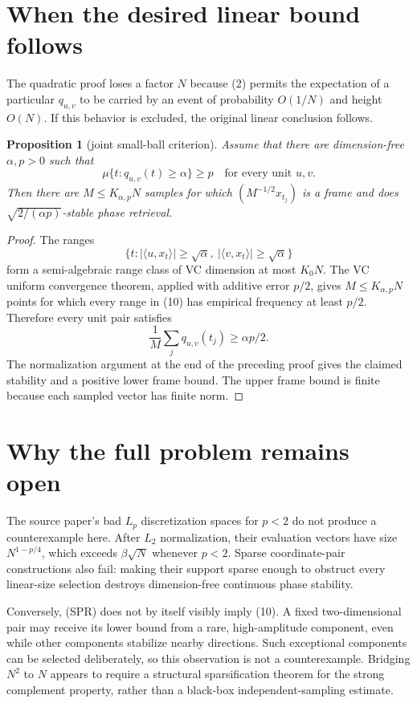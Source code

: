 \documentclass[11pt]{article}
\newtheorem{proposition}{Proposition}
\newcommand{\ip}[2]{\langle #1,#2\rangle}
\begin{document}
\section{When the desired linear bound follows}

The quadratic proof loses a factor $N$ because (2) permits the expectation
of a particular $q_{u,v}$ to be carried by an event of probability
$O(1/N)$ and height $O(N)$.  If this behavior is excluded, the original
linear conclusion follows.

\begin{proposition}[joint small-ball criterion]\label{prop:smallball}
Assume that there are dimension-free $\alpha,p>0$ such that
\[
 \mu\{t:q_{u,v}(t)\ge\alpha\}\ge p
 \quad\text{for every unit }u,v.                              \tag{10}
\]
Then there are $M\le K_{\alpha,p}N$ samples for which
$(M^{-1/2}x_{t_j})$ is a frame and does
$\sqrt{2/(\alpha p)}$-stable phase retrieval.
\end{proposition}

\begin{proof}
The ranges
\[
 \{t:|\ip{u}{x_t}|\ge\sqrt\alpha,\
       |\ip{v}{x_t}|\ge\sqrt\alpha\}
\]
form a semi-algebraic range class of VC dimension at most $K_0N$.
The VC uniform convergence theorem, applied with additive error $p/2$,
gives $M\le K_{\alpha,p}N$ points for which every range in (10) has
empirical frequency at least $p/2$.  Therefore every unit pair satisfies
\[
 \frac1M\sum_jq_{u,v}(t_j)\ge\alpha p/2.
\]
The normalization argument at the end of the preceding proof gives the
claimed stability and a positive lower frame bound.  The upper frame bound
is finite because each sampled vector has finite norm.
\end{proof}

\section{Why the full problem remains open}

The source paper's bad $L_p$ discretization spaces for $p<2$ do not produce
a counterexample here.  After $L_2$ normalization, their evaluation
vectors have size $N^{1-p/4}$, which exceeds $\beta\sqrt N$ whenever
$p<2$.  Sparse coordinate-pair constructions also fail: making their
support sparse enough to obstruct every linear-size selection destroys
dimension-free continuous phase stability.

Conversely, (SPR) does not by itself visibly imply (10).  A fixed
two-dimensional pair may receive its lower bound from a rare,
high-amplitude component, even while other components stabilize nearby
directions.  Such exceptional components can be selected deliberately, so
this observation is not a counterexample.  Bridging $N^2$ to $N$ appears
to require a structural sparsification theorem for the strong complement
property, rather than a black-box independent-sampling estimate.
\end{document}
